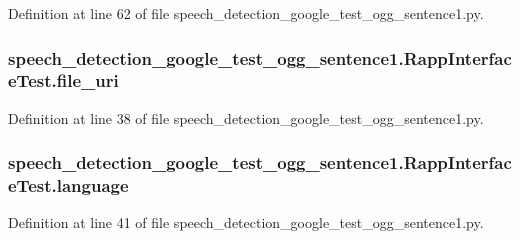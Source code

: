 Definition at line 62 of file speech\-\_\-detection\-\_\-google\-\_\-test\-\_\-ogg\-\_\-sentence1.\-py.

\hypertarget{classspeech__detection__google__test__ogg__sentence1_1_1RappInterfaceTest_aba0935dd3c67e334957499a8ade4e3c1}{
\subsubsection[{file\-\_\-uri}]{\setlength{\rightskip}{0pt plus 5cm}speech\-\_\-detection\-\_\-google\-\_\-test\-\_\-ogg\-\_\-sentence1.\-Rapp\-Interface\-Test.\-file\-\_\-uri}}\label{classspeech__detection__google__test__ogg__sentence1_1_1RappInterfaceTest_aba0935dd3c67e334957499a8ade4e3c1}


Definition at line 38 of file speech\-\_\-detection\-\_\-google\-\_\-test\-\_\-ogg\-\_\-sentence1.\-py.

\hypertarget{classspeech__detection__google__test__ogg__sentence1_1_1RappInterfaceTest_a6b521f3c144eb3f1fd8740c244e118be}{
\subsubsection[{language}]{\setlength{\rightskip}{0pt plus 5cm}speech\-\_\-detection\-\_\-google\-\_\-test\-\_\-ogg\-\_\-sentence1.\-Rapp\-Interface\-Test.\-language}}\label{classspeech__detection__google__test__ogg__sentence1_1_1RappInterfaceTest_a6b521f3c144eb3f1fd8740c244e118be}


Definition at line 41 of file speech\-\_\-detection\-\_\-google\-\_\-test\-\_\-ogg\-\_\-sentence1.\-py.

